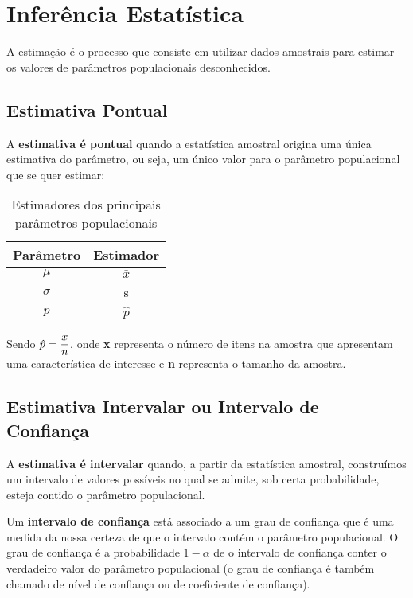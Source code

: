 \chapter{Inferência Estatística}

A estimação é o processo que consiste em utilizar dados amostrais para estimar os valores de parâmetros populacionais desconhecidos. 

\section{Estimativa Pontual}

A \textbf{estimativa é pontual} quando a estatística amostral origina uma única estimativa do parâmetro, ou seja, um único valor para o parâmetro populacional que se quer estimar:

\begin{table}[h]
	\centering	
	\caption{Estimadores dos principais parâmetros populacionais}
	\label{tab:estimadores}
	\begin{tabular}{c|c} 
		Parâmetro	& Estimador	\\
		\hline
		\(\mu\)	& \( \bar{x} \)	\\			
		\(\sigma\) & s		\\
		\( p \)	& \( \hat{p} \)		
	\end{tabular}
\end{table}

Sendo \(\beq{ \hat{p} = \frac{x}{n} }\), onde \textbf{x} representa o número de itens na amostra que apresentam uma característica de interesse e \textbf{n} representa o tamanho da amostra.


\section{Estimativa Intervalar ou Intervalo de Confiança}

A \textbf{estimativa é intervalar} quando, a partir da estatística amostral, construímos um intervalo de valores possíveis no qual se admite, sob certa probabilidade, esteja contido o parâmetro populacional.

Um \textbf{intervalo de confiança} está associado a um grau de confiança que é uma
medida da nossa certeza de que o intervalo contém o parâmetro populacional. O grau de confiança é a probabilidade \(1 - \alpha\) de o intervalo de confiança conter o verdadeiro valor do parâmetro populacional (o grau de confiança é também chamado de nível de confiança ou de coeficiente de confiança).

